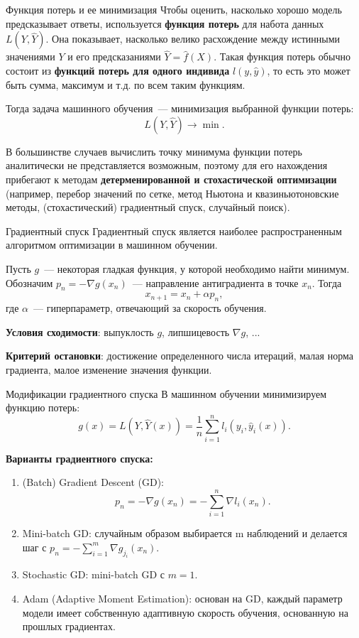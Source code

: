 \documentclass[notheorems, handout]{beamer}
\begin{document}
\begin{frame}{Функция потерь и ее минимизация}
  Чтобы оценить, насколько хорошо модель предсказывает ответы,
  используется {\bf функция потерь} для набота данных $L(Y,
  \hat{Y})$. Она показывает, насколько велико расхождение между
  истинными значениями $Y$ и его предсказаниями $\hat{Y} = \hat{f}
  (X)$. Такая функция потерь обычно состоит из {\bf функций потерь
  для одного индивида} $l(y, \hat{y})$, то есть это может быть сумма,
  максимум и т.д. по всем таким функциям.\smallskip

  Тогда задача машинного обучения~--- минимизация выбранной функции потерь:
  \[
    L(Y, \hat Y)\longrightarrow \min.
  \]\smallskip

  В большинстве случаев вычислить точку минимума функции потерь
  аналитически не представляется возможным, поэтому для его
  нахождения прибегают к методам \textbf{детерменированной и
  стохастической оптимизации} (например, перебор значений по сетке,
    метод Ньютона и квазиньютоновские методы, (стохастический)
  градиентный спуск, случайный поиск).
\end{frame}

\begin{frame}{Градиентный спуск}
  Градиентный спуск является наиболее распространенным алгоритмом
  оптимизации в машинном обучении.\medskip

  Пусть $g$~--- некоторая гладкая функция, у которой необходимо найти
  минимум. Обозначим $p_n=-\nabla g(x_n)$~--- направление
  антиградиента в точке $x_n$. Тогда
  \[
    x_{n+1}=x_n+\alpha p_n,
  \]
  где $\alpha$~--- гиперпараметр, отвечающий за скорость обучения.\medskip

  \textbf{Условия сходимости}: выпуклость $g$, липшицевость $\nabla
  g$, ...\medskip

  \textbf{Критерий остановки}: достижение определенного числа
  итераций, малая норма градиента, малое изменение значения функции.
\end{frame}

\begin{frame}{Модификации градиентного спуска}
  В машинном обучении минимизируем функцию потерь:
  \[
    g(x) = L(Y, \hat{Y} (x)) = \frac{1}{n} \sum _{i = 1} ^n l _i (y
    _i, \hat{y} _i (x)).
  \]\medskip

  {\bf Варианты градиентного спуска:}
  \begin{enumerate}
    \item (Batch) Gradient Descent (GD):
      \[
        p_n=-\nabla g(x_n)=-\sum_{i=1}^n \nabla l_i(x_n).
      \]
    \item Mini-batch GD: случайным образом выбирается \textsf{m}
      наблюдений и делается шаг с $p_n=-\sum_{i=1}^m \nabla
      g_{j_i}(x_n)$.\smallskip
    \item Stochastic GD: mini-batch GD с $m=1$.\smallskip
    \item Adam (Adaptive Moment Estimation): основан на GD, каждый
      параметр модели имеет собственную адаптивную скорость обучения,
      основанную на прошлых градиентах.
  \end{enumerate}
\end{frame}
\end{document}
